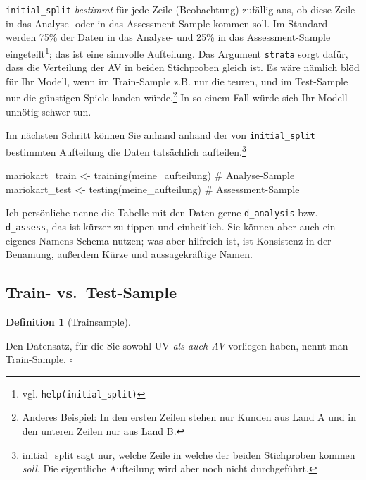 \documentclass[
  a4paper,
]{scrbook}
\newenvironment{Shaded}{\begin{snugshade}}{\end{snugshade}}
\newcommand{\CommentTok}[1]{\textcolor[rgb]{0.37,0.37,0.37}{#1}}
\newcommand{\FunctionTok}[1]{\textcolor[rgb]{0.28,0.35,0.67}{#1}}
\newcommand{\NormalTok}[1]{\textcolor[rgb]{0.00,0.23,0.31}{#1}}
\newcommand{\OtherTok}[1]{\textcolor[rgb]{0.00,0.23,0.31}{#1}}
\theoremstyle{definition}
\theoremstyle{definition}
\newtheorem{definition}{Definition}[chapter]
\theoremstyle{definition}
\theoremstyle{remark}
\begin{document}
\texttt{initial\_split} \emph{bestimmt} für jede Zeile (Beobachtung)
zufällig aus, ob diese Zeile in das Analyse- oder in das
Assessment-Sample kommen soll. Im Standard werden 75\% der Daten in das
Analyse- und 25\% in das Assessment-Sample eingeteilt\footnote{vgl.
  \texttt{help(initial\_split)}}; das ist eine sinnvolle Aufteilung. Das
Argument \texttt{strata} sorgt dafür, dass die Verteilung der AV in
beiden Stichproben gleich ist. Es wäre nämlich blöd für Ihr Modell, wenn
im Train-Sample z.B. nur die teuren, und im Test-Sample nur die
günstigen Spiele landen würde.\footnote{Anderes Beispiel: In den ersten
  Zeilen stehen nur Kunden aus Land A und in den unteren Zeilen nur aus
  Land B.} In so einem Fall würde sich Ihr Modell unnötig schwer tun.

Im nächsten Schritt können Sie anhand anhand der von
\texttt{initial\_split} bestimmten Aufteilung die Daten tatsächlich
aufteilen.\footnote{initial\_split sagt nur, welche Zeile in welche der
  beiden Stichproben kommen \emph{soll}. Die eigentliche Aufteilung wird
  aber noch nicht durchgeführt.}

\begin{Shaded}
\begin{Highlighting}[]
\NormalTok{mariokart\_train }\OtherTok{\textless{}{-}} \FunctionTok{training}\NormalTok{(meine\_aufteilung)  }\CommentTok{\# Analyse{-}Sample}
\NormalTok{mariokart\_test }\OtherTok{\textless{}{-}} \FunctionTok{testing}\NormalTok{(meine\_aufteilung)  }\CommentTok{\# Assessment{-}Sample}
\end{Highlighting}
\end{Shaded}

Ich persönliche nenne die Tabelle mit den Daten gerne
\texttt{d\_analysis} bzw. \texttt{d\_assess}, das ist kürzer zu tippen
und einheitlich. Sie können aber auch ein eigenes Namens-Schema nutzen;
was aber hilfreich ist, ist Konsistenz in der Benamung, außerdem Kürze
und aussagekräftige Namen.

\subsection{Train- vs.~Test-Sample}\label{train--vs.-test-sample}

\begin{definition}[Trainsample]\protect\hypertarget{def-trainsample}{}\label{def-trainsample}

Den Datensatz, für die Sie sowohl UV \emph{als auch AV} vorliegen haben,
nennt man Train-Sample. \(\square\)

\end{definition}
\end{document}
